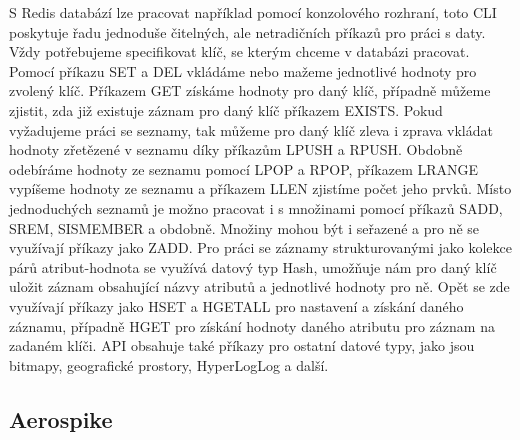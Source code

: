 \documentclass[czech,master,dept460,male,csharp,cpdeclaration]{diploma}
\begin{document}
	S Redis databází lze pracovat například pomocí konzolového rozhraní, toto CLI~\cite{rediscli} poskytuje řadu jednoduše čitelných, ale netradičních příkazů pro práci s daty. Vždy potřebujeme specifikovat klíč, se kterým chceme v databázi pracovat. Pomocí příkazu SET a DEL vkládáme nebo mažeme jednotlivé hodnoty pro zvolený klíč. Příkazem GET získáme hodnoty pro daný klíč, případně můžeme zjistit, zda již existuje záznam pro daný klíč příkazem EXISTS. Pokud vyžadujeme práci se seznamy, tak můžeme pro daný klíč zleva i zprava vkládat hodnoty zřetězené v seznamu díky příkazům LPUSH a RPUSH. Obdobně odebíráme hodnoty ze seznamu pomocí LPOP a RPOP, příkazem LRANGE vypíšeme hodnoty ze seznamu a příkazem LLEN zjistíme počet jeho prvků. Místo jednoduchých seznamů je možno pracovat i s množinami pomocí příkazů SADD, SREM, SISMEMBER a obdobně. Množiny mohou být i seřazené a pro ně se využívají příkazy jako ZADD. Pro práci se záznamy strukturovanými jako kolekce párů atribut-hodnota se využívá datový typ Hash, umožňuje nám pro daný klíč uložit záznam obsahující názvy atributů a jednotlivé hodnoty pro ně. Opět se zde využívají příkazy jako HSET a HGETALL pro nastavení a získání daného záznamu, případně HGET pro získání hodnoty daného atributu pro záznam na zadaném klíči. API obsahuje také příkazy pro ostatní datové typy, jako jsou bitmapy, geografické prostory, HyperLogLog a další.
	
	\subsection{Aerospike} \label{lab-aerospike}
	
\end{document}

